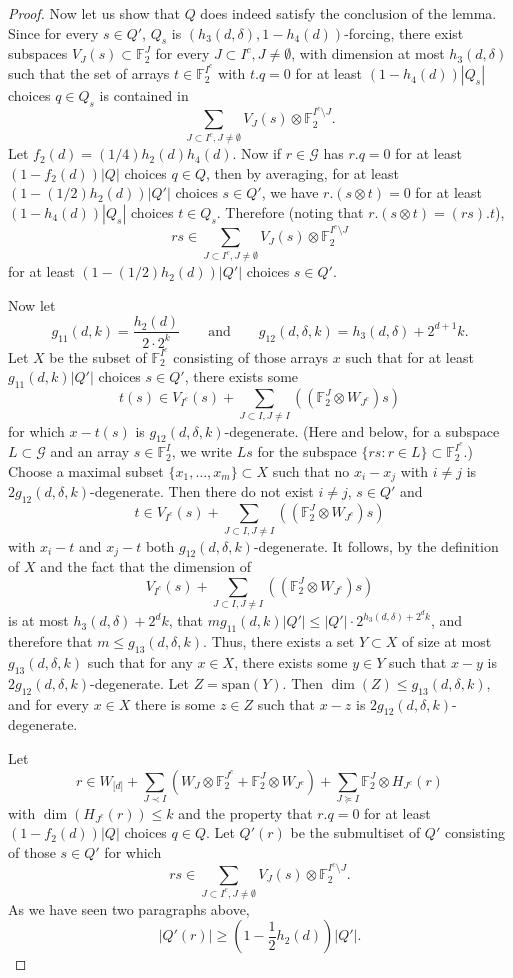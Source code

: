\documentclass[11pt]{article}
\numberwithin{equation}{section}
\theoremstyle{definition}
\theoremstyle{plain}
\newcommand\F{\mathbb{F}}
\renewcommand\d{\delta}
\newcommand \cG{\mathcal G}
\newcommand \s{\subset}
\begin{document}
\begin{proof}
  Now let us show that $Q$ does indeed satisfy the conclusion of the
  lemma. Since for every $s\in Q'$, $Q_s$ is
  $(h_3(d,\d),1-h_4(d))$-forcing, there exist subspaces
  $V_J(s)\s \F_2^{J}$ for every $J\s I^c,J\neq \emptyset$, with
  dimension at most $h_3(d,\d)$ such that the set of arrays
  $t\in \F_2^{I^c}$ with $t.q=0$ for at least $(1-h_4(d))|Q_s|$
  choices $q\in Q_s$ is contained in
  \[
    \sum_{J\s I^c,J\neq \emptyset} V_J(s)\otimes \F_2^{I^c\setminus J}.
  \]
  Let $f_2(d)=({1}/{4}) h_2(d)h_4(d)$. Now if $r\in \cG$ has $r.q=0$
  for at least $(1-f_2(d))|Q|$ choices $q\in Q$, then by averaging,
  for at least $(1-({1}/{2})h_2(d))|Q'|$ choices $s\in Q'$, we have
  $r.(s\otimes t)=0$ for at least $(1-h_4(d))|Q_s|$ choices
  $t\in Q_s$. Therefore (noting that $r.(s\otimes t)=(rs).t$),
  \[
    rs\in \sum_{J\s I^c,J\neq \emptyset} V_J(s)\otimes
    \F_2^{I^c\setminus J}
  \]
  for at least $(1-({1}/{2})h_2(d))|Q'|$ choices $s\in Q'$.
	
  Now let
  \[
    g_{11}(d,k)=\frac{h_2(d)}{2\cdot 2^{k}}\qquad\text{and}\qquad
    g_{12}(d,\d,k)=h_3(d,\d)+2^{d+1}k.
  \]
  Let $X$ be the subset of $\F_2^{I^c}$ consisting of those arrays $x$
  such that for at least $g_{11}(d,k)|Q'|$ choices $s\in Q'$, there
  exists some
  \[
    t(s)\in V_{I^c}(s)+\sum_{J\subset I,J\neq I}((\F_2^{J}\otimes
    W_{J^c})s)
  \]
  for which $x-t(s)$ is $g_{12}(d,\d,k)$-degenerate. (Here and below,
  for a subspace $L\s \cG$ and an array $s\in \F_2^{I}$, we write $Ls$
  for the subspace $\{rs: r\in L\}\s \F_2^{I^c}$.) Choose a maximal
  subset $\{x_1,\dots,x_m\}\s X$ such that no $x_i-x_j$ with $i\neq j$
  is $2g_{12}(d,\d,k)$-degenerate. Then there do not exist $i\neq j$,
  $s\in Q'$ and
  \[
    t\in V_{I^c}(s)+\sum_{J\subset I,J\neq I} ((\F_2^{J}\otimes
    W_{J^c})s)
  \]
  with $x_i-t$ and $x_j-t$ both $g_{12}(d,\d,k)$-degenerate. It
  follows, by the definition of $X$ and the fact that the dimension of
  \[
    V_{I^c}(s)+\sum_{J\subset I,J\neq I} ((\F_2^{J}\otimes W_{J^c})s)
  \]
  is at most $h_3(d,\d)+2^dk$, that
  $mg_{11}(d,k)|Q'|\leq |Q'|\cdot 2^{h_3(d,\d)+2^dk}$, and therefore
  that $m\leq g_{13}(d,\d,k)$. Thus, there exists a set $Y\s X$ of
  size at most $g_{13}(d,\d,k)$ such that for any $x\in X$, there
  exists some $y\in Y$ such that $x-y$ is
  $2g_{12}(d,\d,k)$-degenerate. Let $Z=\text{span}(Y)$. Then
  $\dim(Z)\leq g_{13}(d,\d,k)$, and for every $x\in X$ there is some
  $z\in Z$ such that $x-z$ is $2g_{12}(d,\d,k)$-degenerate.

  Let
  \[r\in W_{\lbrack d\rbrack}+\sum_{J\prec I} (W_J\otimes
    \F_2^{J^c}+\F_2^{J}\otimes W_{J^c})+\sum_{J\succeq I}
    \F_2^{J}\otimes H_{J^c}(r)
  \]
  with $\dim(H_{J^c}(r))\leq k$ and the property that $r.q=0$ for at
  least $(1-f_2(d))|Q|$ choices $q\in Q$. Let $Q'(r)$ be the
  submultiset of $Q'$ consisting of those $s\in Q'$ for which
  \[
    rs\in \sum_{J\s I^c,J\neq \emptyset} V_J(s)\otimes
    \F_2^{I^c\setminus J}.
  \]
  As we have seen two paragraphs above,
  \[
    |Q'(r)|\geq \left(1-\frac{1}{2}h_2(d)\right)|Q'|.
  \]
	

\end{proof}
\end{document}
